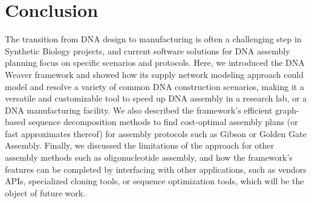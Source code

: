 \section{Conclusion}

The transition from DNA design to manufacturing is often a challenging step in Synthetic Biology projects, and current software solutions for DNA assembly planning focus on specific scenarios and protocols. Here, we introduced the DNA Weaver framework and showed how its supply network modeling approach could model and resolve a variety of common DNA construction scenarios, making it a versatile and customizable tool to speed up DNA assembly in a research lab, or a DNA manufacturing facility. We also described the framework's efficient graph-based sequence decomposition methods to find cost-optimal assembly plans (or fast approximates thereof) for assembly protocols such as Gibson or Golden Gate Assembly. Finally, we discussed the limitations of the approach for other assembly methods such as oligonucleotide assembly, and how the framework's features can be completed by interfacing with other applications, such as vendors APIs, specialized cloning tools, or sequence optimization tools, which will be the object of future work.